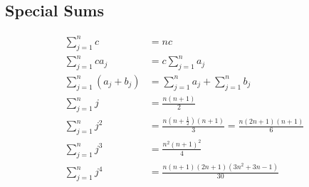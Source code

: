 \subsection{Special Sums}

\[
\begin{aligned}
	\sum_{j=1}^{n} c &= nc \\
	\sum_{j=1}^{n} ca_j &= c \sum_{j=1}^{n} a_j \\
	\sum_{j=1}^{n} (a_j + b_j) &= \sum_{j=1}^{n} a_j + \sum_{j=1}^{n} b_j \\
	\sum_{j=1}^{n} j &= \frac{n(n+1)}{2} \\
	\sum_{j=1}^{n} j^2 &= \frac{n(n+\frac{1}{2})(n+1)}{3} = \frac{n(2n+1)(n+1)}{6} \\
	\sum_{j=1}^{n} j^3 &= \frac{n^2(n+1)^2}{4} \\
	\sum_{j=1}^{n} j^4 &= \frac{n(n+1)(2n+1)(3n^2 + 3n - 1)}{30} \\
\end{aligned}
\]

